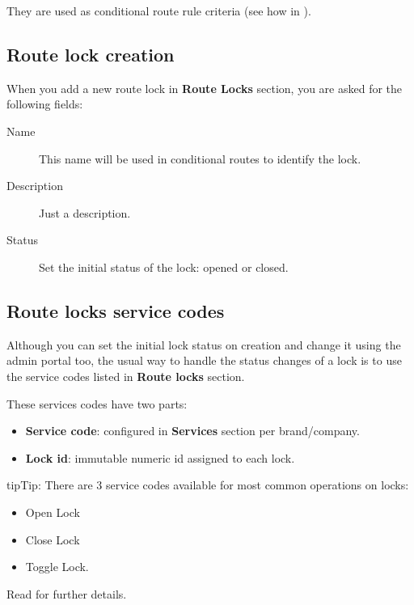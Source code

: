 \documentclass[letterpaper,10pt,english]{sphinxmanual}
\begin{document}
They are used as conditional route rule criteria (see how in {\hyperref[company/conditional_routes:conditional\string-routes]{}}).


\subsection{Route lock creation}
\label{company/route_locks:route-lock-creation}
When you add a new route lock in \textbf{Route Locks} section, you are asked for the following fields:
\begin{description}
\item[{Name}] \leavevmode{}\label{company/route_locks:term-name}
This name will be used in conditional routes to identify the lock.

\item[{Description}] \leavevmode{}\label{company/route_locks:term-description}
Just a description.

\item[{Status}] \leavevmode{}\label{company/route_locks:term-status}
Set the initial status of the lock: opened or closed.

\end{description}


\subsection{Route locks service codes}
\label{company/route_locks:route-locks-service-codes}
Although you can set the initial lock status on creation and change it using the admin portal too, the usual way to
handle the status changes of a lock is to use the service codes listed in \textbf{Route locks} section.

These services codes have two parts:
\begin{itemize}
\item {} 
\textbf{Service code}: configured in \textbf{Services} section per brand/company.

\item {} 
\textbf{Lock id}: immutable numeric id assigned to each lock.

\end{itemize}

\begin{notice}{tip}{Tip:}
There are 3 service codes available for most common operations on locks:
\begin{itemize}
\item {} 
Open Lock

\item {} 
Close Lock

\item {} 
Toggle Lock.

\end{itemize}

Read {\hyperref[platform/services:services]{}} for further details.
\end{notice}
\end{document}
